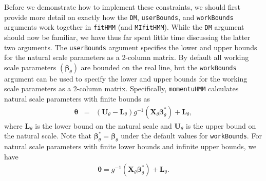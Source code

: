 \documentclass[12pt]{article}\usepackage[]{graphicx}\usepackage[]{xcolor}
\begin{document}
Before we demonstrate how to implement these constraints, we should first provide more detail on exactly how the \verb|DM|, \verb|userBounds|, and \verb|workBounds| arguments work together in \verb|fitHMM| (and \verb|MIfitHMM|). While the \verb|DM| argument should now be familiar, we have thus far spent little time discussing the latter two arguments. The \verb|userBounds| argument specifies the lower and upper bounds for the natural scale parameters as a 2-column matrix.  By default all working scale parameters $({\boldsymbol \beta}_\theta)$ are bounded on the real line, but the \verb|workBounds| argument can be used to specify the lower and upper bounds for the working scale parameters as a 2-column matrix.  Specifically, \verb|momentuHMM| calculates natural scale parameters with finite bounds as
\begin{eqnarray}
\label{eq:link}
{\boldsymbol \theta} &=&  \left({\mathbf U}_\theta - {\mathbf L}_\theta \right) g^{-1} \left( {\mathbf X}_\theta  {\boldsymbol \beta}_\theta^* \right) + {\mathbf L}_\theta, \nonumber
\end{eqnarray}
where ${\mathbf L}_\theta$ is the lower bound on the natural scale and ${\mathbf U}_\theta$ is the upper bound on the natural scale.  Note that ${\boldsymbol \beta}_\theta^*={\boldsymbol \beta}_\theta$ under the default values for \verb|workBounds|. For natural scale parameters with finite lower bounds and infinite upper bounds, we have
\begin{eqnarray*}
{\boldsymbol \theta} =  g^{-1} \left( {\mathbf X}_\theta  {\boldsymbol \beta}_\theta^* \right) + {\mathbf L}_\theta.
\end{eqnarray*}
\end{document}
